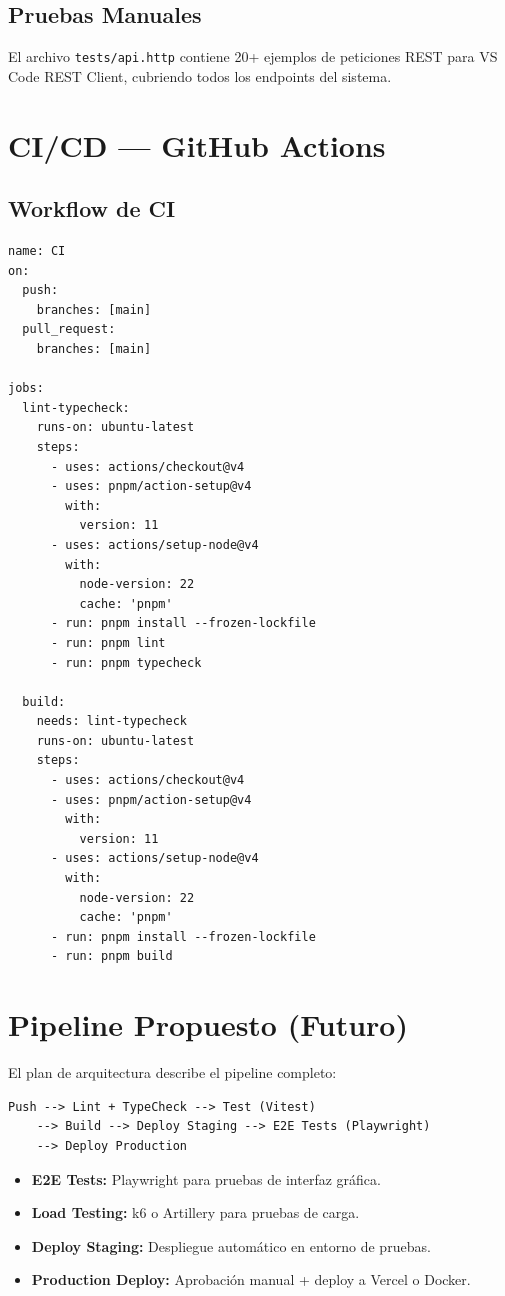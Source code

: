 \subsection{Pruebas Manuales}

El archivo \texttt{tests/api.http} contiene 20+ ejemplos de peticiones
REST para VS Code REST Client, cubriendo todos los endpoints del sistema.

\section{CI/CD --- GitHub Actions}

\subsection{Workflow de CI}

\begin{lstlisting}[style=yaml, caption=.github/workflows/ci.yml]
name: CI
on:
  push:
    branches: [main]
  pull_request:
    branches: [main]

jobs:
  lint-typecheck:
    runs-on: ubuntu-latest
    steps:
      - uses: actions/checkout@v4
      - uses: pnpm/action-setup@v4
        with:
          version: 11
      - uses: actions/setup-node@v4
        with:
          node-version: 22
          cache: 'pnpm'
      - run: pnpm install --frozen-lockfile
      - run: pnpm lint
      - run: pnpm typecheck

  build:
    needs: lint-typecheck
    runs-on: ubuntu-latest
    steps:
      - uses: actions/checkout@v4
      - uses: pnpm/action-setup@v4
        with:
          version: 11
      - uses: actions/setup-node@v4
        with:
          node-version: 22
          cache: 'pnpm'
      - run: pnpm install --frozen-lockfile
      - run: pnpm build
\end{lstlisting}

\section{Pipeline Propuesto (Futuro)}

El plan de arquitectura describe el pipeline completo:

\begin{verbatim}
Push --> Lint + TypeCheck --> Test (Vitest)
    --> Build --> Deploy Staging --> E2E Tests (Playwright)
    --> Deploy Production
\end{verbatim}

\begin{itemize}[leftmargin=*]
    \item \textbf{E2E Tests:} Playwright para pruebas de interfaz gr\'afica.
    \item \textbf{Load Testing:} k6 o Artillery para pruebas de carga.
    \item \textbf{Deploy Staging:} Despliegue autom\'atico en entorno de
          pruebas.
    \item \textbf{Production Deploy:} Aprobaci\'on manual + deploy a Vercel
          o Docker.
\end{itemize}
